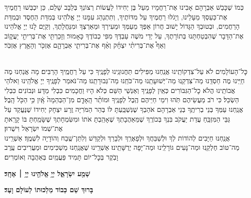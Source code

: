 \documentclass[twoside, openany, parskip=half, 11pt]{book}
\begin{document}
כְּמוֹ שֶׁכָּבַשׁ אַבְרָהָם אָבִינוּ אֶת־רַחֲמָיו מֵעַל בֶּן יְחִידוֹ לַעֲשׂוֹת רְצוֹנְךָ בְּלֵבָב שָׁלֵם, כֵּן יִכְבְּשׁוּ רַחֲמֶיךָ אֶת־כַּעַסְךָ מֵעָלֵינוּ, וְיָגֹלּוּ רַחֲמֶיךָ עַל מִדּוֹתֶיךָ, וְתִתְנַהֵג עִמָּנוּ יְיָ אֱלֹהֵינוּ בְּמִדַּת הַחֶסֶד וּבְמִדַּת הָרַחֲמִים, וּבְטוּבְךָ הַגָּדוֹל יָשׁוּב חֲרוֹן אַפְּךָ מֵעַמְּךָ וּמֵעִירְךָ וּמֵאַרְצְךָ וּמִנַּחֲלָתֶךָ, וְקַיֶּם לָנוּ יְיָ אֱלֹהֵינוּ אֶת־הַדָּבָר שֶׁהִבְטַחְתָּנוּ בְּתוֹרָתֶךָ, עַל יְדֵי משֶׁה עַבְדֶּךָ מִפִּי כְבוֹדֶךָ כָּאָמוּר׃ וְזָכַרְתִּ֖י אֶת־בְּרִיתִ֣י יַעֲק֑וֹב וְאַף֩ אֶת־בְּרִיתִ֨י יִצְחָ֜ק וְאַ֨ף אֶת־בְּרִיתִ֧י אַבְרָהָ֛ם אֶזְכֹּ֖ר וְהָאָ֥רֶץ אֶזְכֹּֽר׃\\
\\

כׇּל־הָעוֹלָמִים לֹא עַל־צִדְקוֹתֵֽינוּ אֲנַֽחְנוּ מַפִּילִים תַּחֲנוּנֵֽינוּ לְפָנֶֽיךָ כִּי עַל רַחֲמֶֽיךָ הָרַבִּים׃ מָה אֲנַחְנוּ מֶה חַיֵּֽינוּ מֶה חַסְדֵּֽנוּ מַה־צִּדְקֵֽנוּ מַה־יְּשׁוּעָתֵֽנוּ מַה־כֹּחֵֽנוּ מַה־גְּבוּרָתֵֽנוּ׃ מַה־נֹּאמַר לְפָנֶֽיךָ יְיָ אֱלֹהֵֽינוּ וֵאלֹהֵי אֲבוֹתֵֽינוּ הֲלֹא כׇל־הַגִּבּוֹרִים כְּאַֽיִן לְפָנֶֽיךָ וְאַנְשֵׁי הַשֵּׁם כְּלֹא הָיוּ וַחֲכָמִים כִּבְלִי מַדָּע וּנְבוֹנִים כִּבְלִי הַשְׂכֵּל׃ כִּי רֹב מַעֲשֵׂיהֶם תֹּֽהוּ וִימֵי חַיֵּיהֶם הֶֽבֶל לְפָנֶֽיךָ וּמוֹתַ֨ר הָֽאָדָ֤ם מִן־הַבְּהֵמָה֙ אָֽ֔יִן כִּ֥י הַכֹּ֖ל הָֽבֶל׃ \\
אֲנַֽחְנוּ עַמְּךָ בְּנֵי בְרִיתֶֽךָ בְּנֵי אַבְרָהָם אֹהַבְךָ שֶׁנִּשְׁבַּֽעְתָּ לּוֹ בְּהַר הַמֹּרִיָּה זֶֽרַע יִצְחָק יְחִידוֹ שֶׁנֶּעֱקַד עַל גַּבֵּי הַמִּזְבֵּֽחַ עֲדַת יַעֲקֹב בִּנְךָ בְּכוֹרֶֽךָ שֶׁמֵּאַהֲבָתְךָ שֶׁאָהַֽבְתָּ אֹתוֹ וּמִשִּׂמְחָתְךָ שֶׁשָּׂמַֽחְתָּ בּוֹ קָרָֽאתָ אֶת־שְׁמוֹ יִשְׂרָאֵל וִישֻׁרוּן׃ \\
אֲנַֽחְנוּ חַיָּבִים לְהוֹדוֹת לְךָ וּלְשַׁבֵּחֲךָ וּלְפָאֶרְֽךָ וּלְבָרֵךְ וּלְקַדֵּשׁ וְלִתֵּן־שֶֽׁבַח וְהוֹדָיָה לִשְׁמֶֽךָ׃ אַשְׁרֵֽינוּ מַה־טּוֹב חֶלְקֵֽנוּ וּמַה־נָּעִים גּוֹרָלֵֽינוּ וּמַה־יָּפָה יְרֻשָּׁתֵֽינוּ׃ אַשְׁרֵֽינוּ שֶׁאֲנַֽחְנוּ מַשְׁכִּימִים וּמַעֲרִיבִים עֶֽרֶב וָבֹֽקֶר בְּכׇל־יוֹם תָּמִיד פַּעֲמַֽיִם בְּאַהֲבָה וְאוֹמְרִים׃

\begin{Large}
\textbf{שְׁמַ֖ע יִשְׂרָאֵ֑ל יְיָ֥ אֱלֹהֵ֖ינוּ יְיָ֥ ׀ אֶחָֽד׃}
\end{Large}

\textbf{%
בָּרוּךְ שֵׁם כְּבוֹד מַלְכוּתוֹ לְעוֹלָם וָעֶד׃
}
\end{document}
